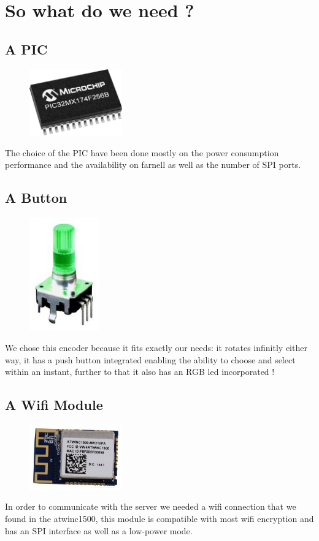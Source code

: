 \documentclass[12pt,a4paper,landscape]{article}
\begin{document}
\section*{So what do we need ?}
	\begin{multicols}{2}
	\subsection*{A PIC}
		\begin{figure}[H]
		\centering
		\includegraphics[width=4cm]{images/pic32.png}
		\end{figure}
		The choice of the PIC have been done mostly on the power consumption performance and the availability on farnell as well as the number of SPI ports.

	\subsection*{A Button}
			\begin{figure}[H]
			\centering
			\includegraphics[width=3cm]{images/rotary_encoder.png}
			\end{figure}
			We chose this encoder because it fits exactly our needs: it rotates infinitly either way, it has a push button integrated enabling the ability to choose and select within an instant, further to that it also has an RGB led incorporated !

	\subsection*{A Wifi Module}
			\begin{figure}[H]
			\centering
			\includegraphics[width=4cm]{images/atwinc1500.png}
			\end{figure}
			In order to communicate with the server we needed a wifi connection that we found in the atwinc1500, this module is compatible with most wifi encryption and has an SPI interface as well as a low-power mode.


\end{multicols}
\end{document}
